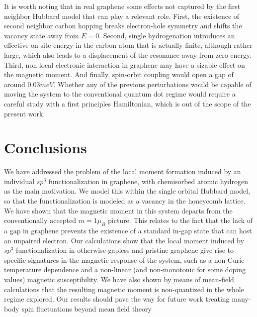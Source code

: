 It is worth noting that in real graphene some effects not captured by the first neighbor Hubbard model that can play a relevant role. First, the existence of second neighbor carbon hopping breaks electron-hole symmetry and shifts  the vacancy state away from $E=0$. Second, single hydrogenation introduces an effective on-site energy in the carbon atom that is actually finite, although rather large, which also leads to a displacement of the resonance away from zero energy.
Third, non-local electronic interaction in graphene may have a sizable effect on the magnetic moment.
And finally, spin-orbit coupling would open a gap of around $0.03meV$.
\cite{Gmitra2009}
Whether any of the previous perturbations would be capable of moving the system to the conventional quantum dot regime would require a careful study with a first principles Hamiltonian, which is out of the scope of the present work.

\section{Conclusions}
\label{sec:Concl}
We have addressed the problem of the local moment formation induced by an individual $sp^3$ functionalization in graphene, with chemisorbed atomic hydrogen as the  main motivation.  We model this within the single orbital Hubbard model, so that the functionalization is modeled as a vacancy in the  honeycomb lattice.  We have shown that the magnetic moment in this system  departs from  the conventionally accepted $m=1\mu_B$ picture. This relates to the fact that the lack of a gap in graphene prevents the existence of a standard in-gap state that can host an unpaired electron. Our calculations show that the local moment induced by $sp^3$ functionalization in otherwise gapless and pristine graphene give rise to specific signatures in the magnetic response of the system, such as a non-Curie temperature dependence and a non-linear (and non-monotonic for some doping values) magnetic susceptibility.
We have also shown by means of mean-field calculations that the resulting magnetic moment is non-quantized in the whole regime explored. Our results should pave the way for future work treating many-body spin fluctuations beyond mean field theory\cite{Haase2011, Sofo2012, Mitchell2013}
